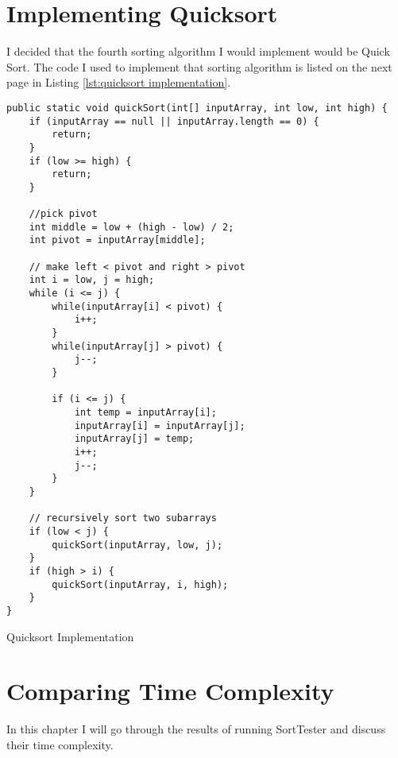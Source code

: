 \documentclass{report}
\begin{document}
\chapter{Implementing Quicksort}

I decided that the fourth sorting algorithm I would implement would be Quick Sort. The code I used to implement that sorting algorithm is listed on the next page in Listing \ref{lst:quicksort implementation}.

\begin{listing}[ht]
\begin{verbatim}
public static void quickSort(int[] inputArray, int low, int high) {
    if (inputArray == null || inputArray.length == 0) {
        return;
    }
    if (low >= high) {
        return;
    }

    //pick pivot
    int middle = low + (high - low) / 2;
    int pivot = inputArray[middle];

    // make left < pivot and right > pivot
    int i = low, j = high;
    while (i <= j) {
        while(inputArray[i] < pivot) {
            i++;
        }
        while(inputArray[j] > pivot) {
            j--;
        }

        if (i <= j) {
            int temp = inputArray[i];
            inputArray[i] = inputArray[j];
            inputArray[j] = temp;
            i++;
            j--;
        }
    }

    // recursively sort two subarrays
    if (low < j) {
        quickSort(inputArray, low, j);
    }
    if (high > i) {
        quickSort(inputArray, i, high);
    }
}
\end{verbatim}
\caption{Quicksort Implementation}
\label{lst:quicksort implementation}
\end{listing}

\chapter{Comparing Time Complexity}

In this chapter I will go through the results of running Sort\textunderscore Tester and discuss their time complexity.

\end{document}
